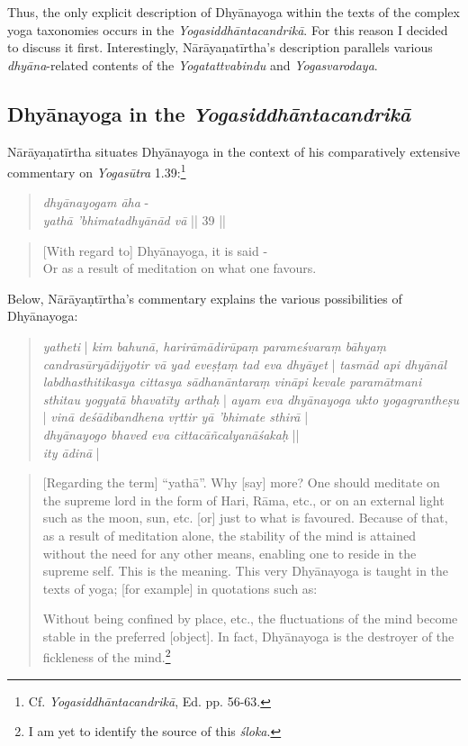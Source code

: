 Thus, the only explicit description of Dhyānayoga within the texts of the complex yoga taxonomies occurs in the \textit{Yogasiddhāntacandrikā}. For this reason I decided to discuss it first. Interestingly, Nārāyaṇatīrtha's description parallels various \textit{dhyāna}-related contents of the \textit{Yogatattvabindu} and \textit{Yogasvarodaya}.      

\subsection{Dhyānayoga in the \textit{Yogasiddhāntacandrikā}}

Nārāyaṇatīrtha situates Dhyānayoga in the context of his comparatively extensive commentary on \textit{Yogasūtra} 1.39:\footnote{Cf. \emph{Yogasiddhāntacandrikā}, Ed. pp. 56-63.}

\begin{quote}
\textit{dhyānayogam āha} - \\
\textit{yathā 'bhimatadhyānād vā} || 39 ||
\end{quote}
\begin{quote}
[With regard to] Dhyānayoga, it is said - \\
 Or as a result of meditation on what one favours.
\end{quote}

Below, Nārāyaṇtīrtha's commentary explains the various possibilities of Dhyānayoga: 

\begin{quote}
  \textit{yatheti} | \textit{kim bahunā, harirāmādirūpaṃ parameśvaraṃ bāhyaṃ candrasūryādijyotir vā yad eveṣṭaṃ tad eva dhyāyet} | \textit{tasmād api dhyānāl labdhasthitikasya cittasya sādhanāntaraṃ vināpi kevale paramātmani sthitau yogyatā bhavatīty arthaḥ} | \textit{ayam eva dhyānayoga ukto yogagrantheṣu} |  
  \textit{vinā deśādibandhena vṛttir yā 'bhimate sthirā} |\\
  \textit{dhyānayogo bhaved eva cittacāñcalyanāśakaḥ} ||\\
    \textit{ity ādinā} | 
\end{quote}

\begin{quote}
  [Regarding the term] ``yathā''. Why [say] more? One should meditate on the supreme lord in the form of Hari, Rāma, etc., or on an external light such as the moon, sun, etc. [or] just to what is favoured. Because of that, as a result of meditation alone, the stability of the mind is attained without the need for any other means, enabling one to reside in the supreme self. This is the meaning. This very Dhyānayoga is taught in the texts of yoga; [for example] in quotations such as: 

  Without being confined by place, etc., the fluctuations of the mind become stable in the preferred [object]. In fact, Dhyānayoga is the destroyer of the fickleness of the mind.\footnote{I am yet to identify the source of this \textit{śloka}.}\\
  
\end{quote}

